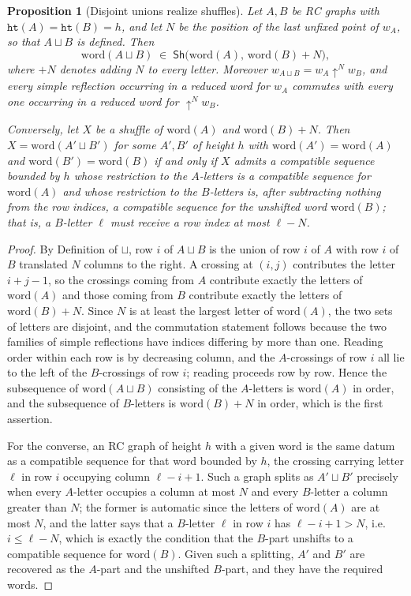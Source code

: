 \documentclass{amsart}
\newtheorem{proposition}[lemma]{Proposition}
\theoremstyle{definition}
\theoremstyle{remark}
\numberwithin{equation}{subsection}
\newcommand{\shup}{{\uparrow}}
\newcommand{\wof}[1]{w_{#1}}
\newcommand{\hr}{\mathtt{ht}}
\begin{document}
\begin{proposition}[Disjoint unions realize shuffles]\label{proposition:unionshuffle}
Let $A,B$ be RC graphs with $\hr(A)=\hr(B)=h$, and let $N$ be the position of the last unfixed point of $\wof A$, so that $A\sqcup B$ is defined. Then
$$\mathrm{word}(A\sqcup B)\;\in\;\mathsf{Sh}\bigl(\mathrm{word}(A),\,\mathrm{word}(B)+N\bigr),$$
where $+N$ denotes adding $N$ to every letter. Moreover $\wof{A\sqcup B}=\wof A\shup^{N}\wof B$, and every simple reflection occurring in a reduced word for $\wof A$ commutes with every one occurring in a reduced word for $\shup^{N}\wof B$.

Conversely, let $X$ be a shuffle of $\mathrm{word}(A)$ and $\mathrm{word}(B)+N$. Then $X=\mathrm{word}(A'\sqcup B')$ for some $A',B'$ of height $h$ with $\mathrm{word}(A')=\mathrm{word}(A)$ and $\mathrm{word}(B')=\mathrm{word}(B)$ if and only if $X$ admits a compatible sequence bounded by $h$ whose restriction to the $A$-letters is a compatible sequence for $\mathrm{word}(A)$ and whose restriction to the $B$-letters is, after subtracting nothing from the row indices, a compatible sequence for the \emph{unshifted} word $\mathrm{word}(B)$; that is, a $B$-letter $\ell$ must receive a row index at most $\ell-N$.
\end{proposition}
\begin{proof}
By Definition of $\sqcup$, row $i$ of $A\sqcup B$ is the union of row $i$ of $A$ with row $i$ of $B$ translated $N$ columns to the right. A crossing at $(i,j)$ contributes the letter $i+j-1$, so the crossings coming from $A$ contribute exactly the letters of $\mathrm{word}(A)$ and those coming from $B$ contribute exactly the letters of $\mathrm{word}(B)+N$. Since $N$ is at least the largest letter of $\mathrm{word}(A)$, the two sets of letters are disjoint, and the commutation statement follows because the two families of simple reflections have indices differing by more than one. Reading order within each row is by decreasing column, and the $A$-crossings of row $i$ all lie to the left of the $B$-crossings of row $i$; reading proceeds row by row. Hence the subsequence of $\mathrm{word}(A\sqcup B)$ consisting of the $A$-letters is $\mathrm{word}(A)$ in order, and the subsequence of $B$-letters is $\mathrm{word}(B)+N$ in order, which is the first assertion.

For the converse, an RC graph of height $h$ with a given word is the same datum as a compatible sequence for that word bounded by $h$, the crossing carrying letter $\ell$ in row $i$ occupying column $\ell-i+1$. Such a graph splits as $A'\sqcup B'$ precisely when every $A$-letter occupies a column at most $N$ and every $B$-letter a column greater than $N$; the former is automatic since the letters of $\mathrm{word}(A)$ are at most $N$, and the latter says that a $B$-letter $\ell$ in row $i$ has $\ell-i+1>N$, i.e.\ $i\leq \ell-N$, which is exactly the condition that the $B$-part unshifts to a compatible sequence for $\mathrm{word}(B)$. Given such a splitting, $A'$ and $B'$ are recovered as the $A$-part and the unshifted $B$-part, and they have the required words.
\end{proof}
\end{document}
